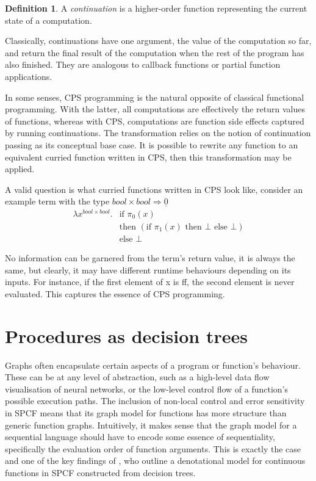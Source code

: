 \documentclass[12pt,a4paper]{report}
\theoremstyle{definition}
\theoremstyle{definition}
\newtheorem{definition}{Definition}[chapter]%
\theoremstyle{remark}
\begin{document}
\begin{definition}
    A \emph{continuation} is a higher-order function representing the current state of a computation.
    
    Classically, continuations have one argument, the value of the computation so far, and return the final result of the computation when the rest of the program has also finished. They are analogous to callback functions or partial function applications. 
\end{definition}

In some senses, CPS programming is the natural opposite of classical functional programming. With the latter, all computations are effectively the return values of functions, whereas with CPS, computations are function side effects captured by running continuations. The transformation relies on the notion of continuation passing as its conceptual base case. It is possible to rewrite any function to an equivalent curried function written in CPS, then this transformation may be applied.

A valid question is what curried functions written in CPS look like, consider an example term with the type $bool \times bool \Rightarrow \underline{0}$
\[
\begin{split}
\lambda x^{bool \times bool}. &\text{if } \pi_0(x)  \\
&\text{then }( \text{if } \pi_1(x) \text{ then } \bot \text{ else } \bot )\\
&\text{else } \bot
\end{split}
\]

No information can be garnered from the term's return value, it is always the same, but clearly, it may have different runtime behaviours depending on its inputs. For instance, if the first element of x is ff, the second element is never evaluated. This captures the essence of CPS programming.

\section{Procedures as decision trees}
Graphs often encapsulate certain aspects of a program or function's behaviour. These can be at any level of abstraction, such as a high-level data flow visualisation of neural networks, or the low-level control flow of a function's possible execution paths. The inclusion of non-local control and error sensitivity in SPCF means that its graph model for functions has more structure than generic function graphs. Intuitively, it makes sense that the graph model for a sequential language should have to encode some essence of sequentiality, specifically the evaluation order of function arguments. This is exactly the case and one of the key findings of \cite{cartwright_1992}, who outline a denotational model for continuous functions in SPCF constructed from decision trees. 
\end{document}
